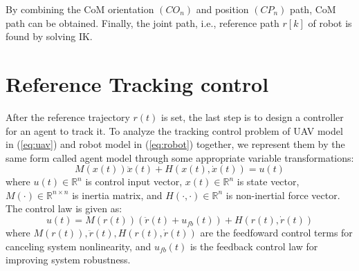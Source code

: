 \documentclass{ieeeaccess}
\begin{document}
By combining the CoM orientation $(CO_n)$ and position $(CP_n)$ path, CoM path can be obtained. Finally, the joint path, i.e., reference path $r[k]$ of robot is found by solving IK.

\section{Reference Tracking control}
After the reference trajectory $r(t)$ is set, the last step is to design a controller for an agent to track it. To analyze the tracking control problem of UAV model in (\ref{eq:uav}) and robot model in (\ref{eq:robot}) together, we represent them by the same form called agent model through some appropriate variable transformations:
\begin{equation} \label{eq:agent} 
    M(x(t))\ddot{x}(t) + H(x(t),\dot{x}(t)) = u(t)
\end{equation}
where $u(t)\in\mathbb{R}^n$ is control input vector, $x(t)\in\mathbb{R}^n$ is state vector, $M(\cdot)\in\mathbb{R}^{n\times n}$ is inertia matrix, and $H(\cdot, \cdot)\in\mathbb{R}^n$ is non-inertial force vector. The control law is given as:
\begin{equation} \label{eq:control}
    u(t)= M(r(t))(\ddot{r}(t) + u_{fb}(t)) + H(r(t),\dot{r}(t)) 
\end{equation}
where $M(r(t)),\ddot{r}(t),H(r(t),\dot{r}(t))$ are the feedfoward control terms for canceling system nonlinearity, and $u_{fb}(t)$ is the feedback control law for improving system robustness.
\end{document}
